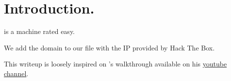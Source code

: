 \section{Introduction.}
\par {} is a machine rated easy.
\par We add the domain  to our  file with the IP provided by Hack The Box.
\par This writeup is loosely inspired on 's walkthrough available on his \href{https://www.youtube.com/c/ippsec}{youtube channel}.
